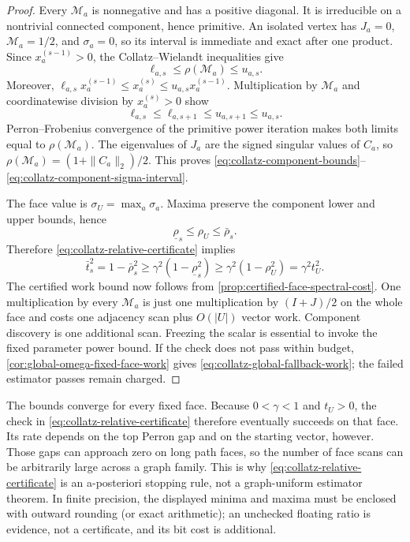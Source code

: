 \begin{proof}
Every $\mathcal M_a$ is nonnegative and has a positive diagonal.  It is
irreducible on a nontrivial connected component, hence primitive.  An isolated
vertex has $J_a=0$, $\mathcal M_a=1/2$, and $\sigma_a=0$, so its interval is
immediate and exact after one product.  Since $x_a^{(s-1)}>0$, the
Collatz--Wielandt inequalities give
\begin{equation*}
 \ell_{a,s}\le\rho(\mathcal M_a)\le u_{a,s}.
\end{equation*}
Moreover,
$\ell_{a,s}x_a^{(s-1)}\le x_a^{(s)}\le
u_{a,s}x_a^{(s-1)}$.  Multiplication by $\mathcal M_a$ and coordinatewise
division by $x_a^{(s)}>0$ show
\begin{equation*}
 \ell_{a,s}\le\ell_{a,s+1}\le u_{a,s+1}\le u_{a,s}.
\end{equation*}
Perron--Frobenius convergence of the primitive power iteration makes both
limits equal to $\rho(\mathcal M_a)$.  The eigenvalues of $J_a$ are the signed
singular values of $C_a$, so
$\rho(\mathcal M_a)=(1+\|C_a\|_2)/2$.  This proves
\eqref{eq:collatz-component-bounds}--
\eqref{eq:collatz-component-sigma-interval}.

The face value is $\sigma_U=\max_a\sigma_a$.  Maxima preserve the component
lower and upper bounds, hence
\begin{equation*}
 \underline\rho_s\le\rho_U\le\bar\rho_s.
\end{equation*}
Therefore \eqref{eq:collatz-relative-certificate} implies
\begin{equation*}
 \bar t_s^2=1-\bar\rho_s^2
 \ge\gamma^2(1-\underline\rho_s^2)
 \ge\gamma^2(1-\rho_U^2)=\gamma^2t_U^2.
\end{equation*}
The certified work bound now follows from
\cref{prop:certified-face-spectral-cost}.  One multiplication by every
$\mathcal M_a$ is just one multiplication by $(I+J)/2$ on the whole face and
costs one adjacency scan plus $O(|U|)$ vector work.  Component discovery is
one additional scan.  Freezing the scalar is essential to invoke the fixed
parameter power bound.  If the check does not pass within budget,
\cref{cor:global-omega-fixed-face-work} gives
\eqref{eq:collatz-global-fallback-work}; the failed estimator passes remain
charged.
\end{proof}

The bounds converge for every fixed face.  Because $0<\gamma<1$ and
$t_U>0$, the check in \eqref{eq:collatz-relative-certificate} therefore
eventually succeeds on that face.  Its rate depends on the top Perron gap and
on the starting vector, however.  Those gaps can approach zero on long path
faces, so the number of face scans can be arbitrarily large across a graph
family.  This is why \eqref{eq:collatz-relative-certificate} is an
a-posteriori stopping rule, not a graph-uniform estimator theorem.  In finite
precision, the displayed minima and maxima must be enclosed with outward
rounding (or exact arithmetic); an unchecked floating ratio is evidence, not
a certificate, and its bit cost is additional.

